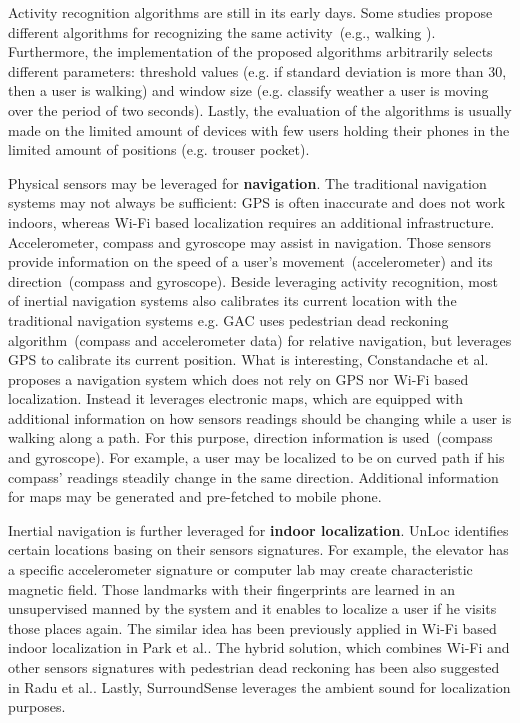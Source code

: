Activity recognition algorithms are still in its early days. Some studies propose different algorithms for recognizing the same activity\ (e.g., walking \cite{benabdesslem:senseless} \cite{rachuri:socialsense} \cite{Kwapisz2011} ). Furthermore, the implementation of the proposed algorithms arbitrarily selects different parameters: threshold values (e.g. if standard deviation is more than 30, then a user is walking) and window size (e.g. classify weather a user is moving over the period of two seconds). Lastly, the evaluation of the algorithms is usually made on the limited amount of devices with few users holding their phones in the limited amount of positions (e.g. trouser pocket). 

Physical sensors may be leveraged for \textbf{navigation}. The traditional navigation systems may not always be sufficient: GPS is often inaccurate and does not work indoors, whereas Wi-Fi based localization requires an additional infrastructure. Accelerometer, compass and gyroscope may assist in navigation. Those sensors provide information on the speed of a user's movement\ (accelerometer) and its direction\ (compass and gyroscope). Beside leveraging activity recognition, most of inertial navigation systems also calibrates its current location with the traditional navigation systems e.g. GAC \cite{youssef:gac} uses pedestrian dead reckoning algorithm\ (compass and accelerometer data) for relative navigation, but leverages GPS to calibrate its current position. What is interesting, Constandache et al.\cite{constandache:localization} proposes a navigation system which does not rely on GPS nor Wi-Fi based localization. Instead it leverages electronic maps, which are equipped with additional information on how sensors readings should be changing while a user is walking along a path. For this purpose, direction information is used\ (compass and gyroscope). For example, a user may be localized to be on curved path if his compass' readings steadily change in the same direction. Additional information for maps may be generated and pre-fetched to mobile phone.

Inertial navigation is further leveraged for \textbf{indoor localization}. UnLoc \cite{Wang:unsupervised} identifies certain locations basing on their sensors signatures. For example, the elevator has a specific accelerometer signature or computer lab may create characteristic magnetic field. Those landmarks with their fingerprints are learned in an unsupervised manned by the system and it enables to localize a user if he visits those places again. The similar idea has been previously applied in Wi-Fi based indoor localization in Park et al.\cite{park:organic}. The hybrid solution, which combines Wi-Fi and other sensors signatures with pedestrian dead reckoning has been also suggested in Radu et al.\cite{radu:hybrid}. Lastly, SurroundSense \cite{azizyan:surroundsense} leverages the ambient sound for localization purposes.

